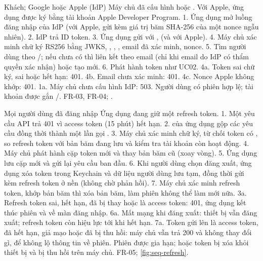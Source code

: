 {Khách; Google hoặc Apple (IdP)}
{Máy chủ đã cấu hình  hoặc . Với Apple, ứng dụng được ký bằng tài khoản Apple Developer Program.}
{1. Ứng dụng mở luồng đăng nhập của IdP (với Apple, gửi kèm giá trị băm SHA-256 của một nonce ngẫu nhiên). 2. IdP trả ID token. 3. Ứng dụng gửi  với ,  (và  với Apple). 4. Máy chủ xác minh chữ ký RS256 bằng JWKS, , , , email đã xác minh, nonce. 5. Tìm người dùng theo /; nếu chưa có thì liên kết theo email (chỉ khi email do IdP có thẩm quyền xác nhận) hoặc tạo mới. 6. Phát hành token như UC02.}
{4a. Token sai chữ ký, sai  hoặc hết hạn: 401. 4b. Email chưa xác minh: 401. 4c. Nonce Apple không khớp: 401. 1a. Máy chủ chưa cấu hình IdP: 503.}
{Người dùng có phiên hợp lệ; tài khoản được gắn /.}
{FR-03, FR-04; \cite{oidc,googleidtoken,applesignin}.}

{Mọi người dùng đã đăng nhập}
{Ứng dụng đang giữ một refresh token.}
{1. Một yêu cầu API trả 401 vì access token (15 phút) hết hạn. 2.  của ứng dụng gộp các yêu cầu đồng thời thành một lần gọi . 3. Máy chủ xác minh chữ ký, từ chối token có , so refresh token với bản băm đang lưu và kiểm tra tài khoản còn hoạt động. 4. Máy chủ phát hành cặp token mới và thay bản băm cũ (xoay vòng). 5. Ứng dụng lưu cặp mới và gửi lại yêu cầu ban đầu. 6. Khi người dùng chọn đăng xuất, ứng dụng xóa token trong Keychain và dữ liệu người dùng lưu tạm, đồng thời gửi  kèm refresh token ở nền (không chờ phản hồi). 7. Máy chủ xác minh refresh token, khớp bản băm thì xóa bản băm, làm phiên không thể làm mới nữa.}
{3a. Refresh token sai, hết hạn, đã bị thay hoặc là access token: 401, ứng dụng kết thúc phiên và về màn đăng nhập. 6a. Mất mạng khi đăng xuất: thiết bị vẫn đăng xuất; refresh token còn hiệu lực tới khi hết hạn. 7a. Token gửi lên là access token, đã hết hạn, giả mạo hoặc đã bị thu hồi: máy chủ vẫn trả 200 và không thay đổi gì, để không lộ thông tin về phiên.}
{Phiên được gia hạn; hoặc token bị xóa khỏi thiết bị và bị thu hồi trên máy chủ.}
{FR-05; \cref{fig:seq-refresh}.}


